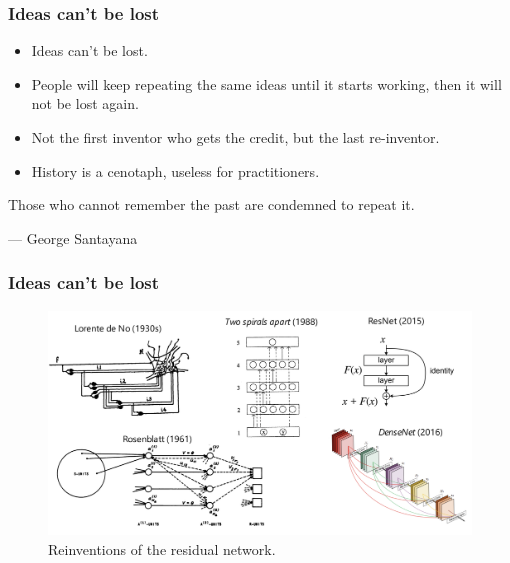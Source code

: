 \documentclass{beamer}
\begin{document}
\begin{frame}
\frametitle{Ideas can't be lost}
    
\begin{itemize}
    \item Ideas can't be lost.
    \item People will keep repeating the same ideas until it starts working, then it will not be lost again.
    \item Not the first inventor who gets the credit, but the last re-inventor.
    \item History is a cenotaph, useless for practitioners.
\end{itemize}

\begin{displayquote}
Those who cannot remember the past are condemned to repeat it.

--- George Santayana
\end{displayquote}
\end{frame}

\begin{frame}
    \frametitle{Ideas can't be lost}

    \begin{figure}[t]
        \includegraphics[width=\textwidth]{figure/ResNet_history.png}
        \centering
        \caption{Reinventions of the residual network.}
    \end{figure}
\end{frame}
\end{document}
